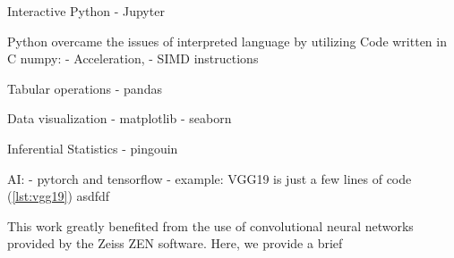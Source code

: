Interactive Python
- Jupyter

Python overcame the issues of interpreted language by utilizing Code
written in C
numpy:
- Acceleration,
- SIMD instructions

Tabular operations
- pandas

Data visualization
- matplotlib
- seaborn


Inferential Statistics
- pingouin

AI:
- pytorch and tensorflow
- example: VGG19 is just a few lines of code (\autoref{lst:vgg19}) asdfdf


This work greatly benefited from the use of convolutional neural
networks provided by the Zeiss ZEN software. Here, we provide a brief
